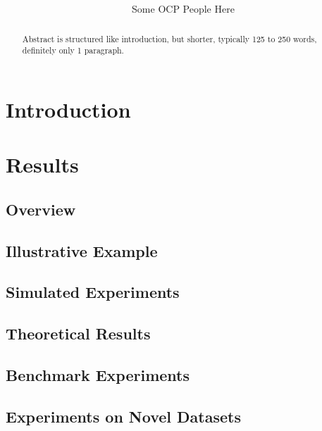 \documentclass{article}
\title{\vspace{-50pt}
\db{Some Title Here}
}
\author{Some OCP People Here}
\begin{document}
\maketitle

\begin{abstract}
Abstract is structured like introduction, but shorter, typically 125 to 250 words, definitely only 1 paragraph.
\end{abstract}

\section{Introduction}











\section{Results}



\subsection{Overview}


\subsection{Illustrative Example}

\subsection{Simulated Experiments}

\subsection{Theoretical Results}

\subsection{Benchmark Experiments}

\subsection{Experiments on Novel Datasets}
\end{document}
